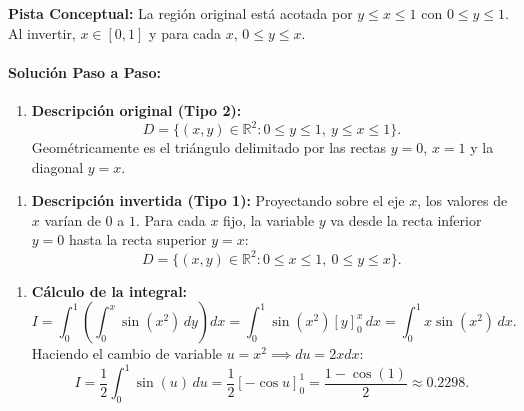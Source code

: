 \documentclass[11pt,a4paper]{article}
\begin{document}
\begin{tcolorbox}[colback=yellow!4,colframe=accentamber!70,arc=1mm,boxrule=0.5pt,left=3mm,right=3mm,top=1.5mm,bottom=1.5mm]
\textbf{Pista Conceptual:} La región original está acotada por $y \le x \le 1$ con $0 \le y \le 1$. Al invertir, $x \in [0,1]$ y para cada $x$, $0 \le y \le x$.
\end{tcolorbox}

\paragraph{Solución Paso a Paso:}\par
\begin{enumerate}[label=\textbf{\arabic*.}]
\item \textbf{Descripción original (Tipo 2):}
\begin{equation*}
D = \{(x,y) \in \mathbb{R}^2 : 0 \le y \le 1, \ y \le x \le 1\}.
\end{equation*}
Geométricamente es el triángulo delimitado por las rectas $y = 0$, $x = 1$ y la diagonal $y = x$.
\end{enumerate}

\begin{enumerate}[label=\textbf{\arabic*.}]
\item \textbf{Descripción invertida (Tipo 1):}
Proyectando sobre el eje $x$, los valores de $x$ varían de $0$ a $1$.
Para cada $x$ fijo, la variable $y$ va desde la recta inferior $y = 0$ hasta la recta superior $y = x$:
\begin{equation*}
D = \{(x,y) \in \mathbb{R}^2 : 0 \le x \le 1, \ 0 \le y \le x\}.
\end{equation*}
\end{enumerate}

\begin{enumerate}[label=\textbf{\arabic*.}]
\item \textbf{Cálculo de la integral:}
\begin{equation*}
I = \int_0^1 \left( \int_0^x \sin(x^2) \, dy \right) dx = \int_0^1 \sin(x^2) [y]_0^x \, dx = \int_0^1 x \sin(x^2) \, dx.
\end{equation*}
Haciendo el cambio de variable $u = x^2 \implies du = 2x dx$:
\begin{equation*}
I = \frac{1}{2} \int_0^1 \sin(u) \, du = \frac{1}{2} [-\cos u]_0^1 = \frac{1 - \cos(1)}{2} \approx 0.2298.
\end{equation*}
\end{enumerate}
\end{document}
